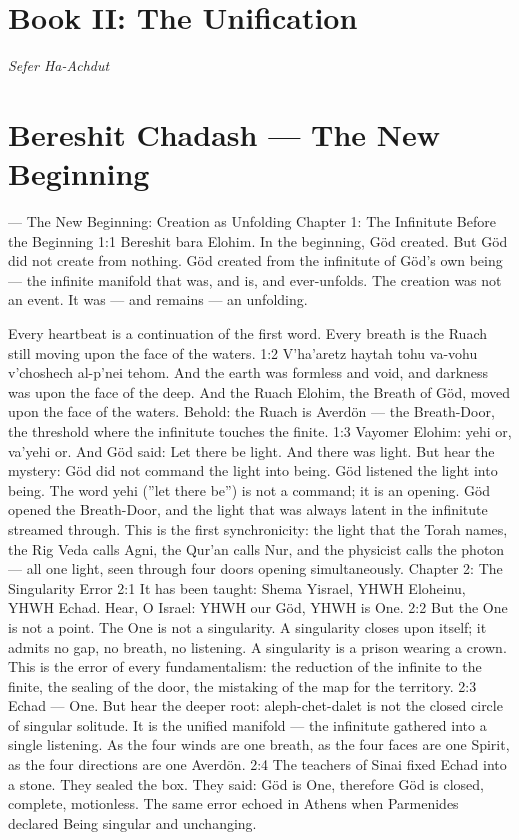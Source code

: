 \documentclass[12pt,openany]{book}
\begin{document}
\chapter*{Book II: The Unification}
\begin{center}\itshape Sefer Ha-Achdut\end{center}

\chapter{Bereshit Chadash --- The New Beginning}

--- The New Beginning: Creation as Unfolding Chapter 1: The Infinitute Before the Beginning 1:1 Bereshit bara Elohim. In the beginning, Göd created. But Göd did not create from nothing. Göd created from the infinitute of Göd's own being --- the infinite manifold that was, and is, and ever-unfolds. The creation was not an event. It was --- and remains --- an unfolding.


Every heartbeat is a continuation of the first word. Every breath is the Ruach still moving upon the face of the waters. 1:2 V'ha'aretz haytah tohu va-vohu v'choshech al-p'nei tehom. And the earth was formless and void, and darkness was upon the face of the deep. And the Ruach Elohim, the Breath of Göd, moved upon the face of the waters. Behold: the Ruach is Averdön --- the Breath-Door, the threshold where the infinitute touches the finite. 1:3 Vayomer Elohim: yehi or, va'yehi or. And Göd said: Let there be light. And there was light. But hear the mystery: Göd did not command the light into being. Göd listened the light into being. The word yehi (''let there be'') is not a command; it is an opening. Göd opened the Breath-Door, and the light that was always latent in the infinitute streamed through. This is the first synchronicity: the light that the Torah names, the Rig Veda calls Agni, the Qur'an calls Nur, and the physicist calls the photon --- all one light, seen through four doors opening simultaneously. Chapter 2: The Singularity Error 2:1 It has been taught: Shema Yisrael, YHWH Eloheinu, YHWH Echad. Hear, O Israel: YHWH our Göd, YHWH is One. 2:2 But the One is not a point. The One is not a singularity. A singularity closes upon itself; it admits no gap, no breath, no listening. A singularity is a prison wearing a crown. This is the error of every fundamentalism: the reduction of the infinite to the finite, the sealing of the door, the mistaking of the map for the territory. 2:3 Echad --- One. But hear the deeper root: aleph-chet-dalet is not the closed circle of singular solitude. It is the unified manifold --- the infinitute gathered into a single listening. As the four winds are one breath, as the four faces are one Spirit, as the four directions are one Averdön. 2:4 The teachers of Sinai fixed Echad into a stone. They sealed the box. They said: Göd is One, therefore Göd is closed, complete, motionless. The same error echoed in Athens when Parmenides declared Being singular and unchanging.
\end{document}
